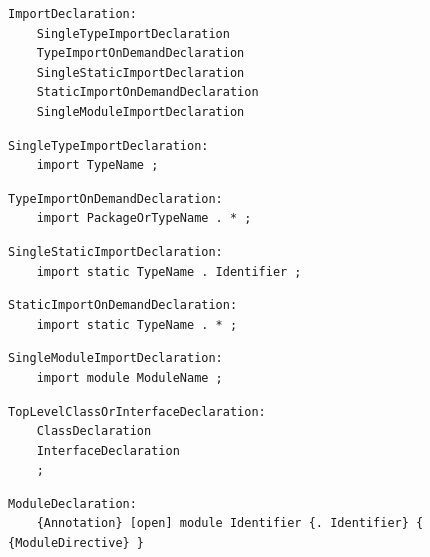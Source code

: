 \noindent\textbf{\texttt{}}\par
\begin{lstlisting}
ImportDeclaration:
    SingleTypeImportDeclaration
    TypeImportOnDemandDeclaration
    SingleStaticImportDeclaration
    StaticImportOnDemandDeclaration
    SingleModuleImportDeclaration
\end{lstlisting}

\noindent\textbf{\texttt{}}\par
\begin{lstlisting}
SingleTypeImportDeclaration:
    import TypeName ;
\end{lstlisting}

\noindent\textbf{\texttt{}}\par
\begin{lstlisting}
TypeImportOnDemandDeclaration:
    import PackageOrTypeName . * ;
\end{lstlisting}

\noindent\textbf{\texttt{}}\par
\begin{lstlisting}
SingleStaticImportDeclaration:
    import static TypeName . Identifier ;
\end{lstlisting}

\noindent\textbf{\texttt{}}\par
\begin{lstlisting}
StaticImportOnDemandDeclaration:
    import static TypeName . * ;
\end{lstlisting}

\noindent\textbf{\texttt{}}\par
\begin{lstlisting}
SingleModuleImportDeclaration:
    import module ModuleName ;
\end{lstlisting}

\noindent\textbf{\texttt{}}\par
\begin{lstlisting}
TopLevelClassOrInterfaceDeclaration:
    ClassDeclaration
    InterfaceDeclaration
    ;
\end{lstlisting}

\noindent\textbf{\texttt{}}\par
\begin{lstlisting}
ModuleDeclaration:
    {Annotation} [open] module Identifier {. Identifier} { {ModuleDirective} }
\end{lstlisting}

